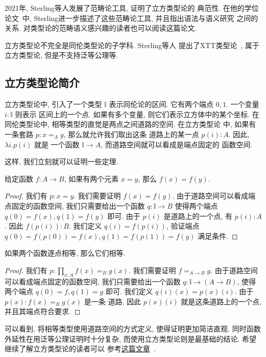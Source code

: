 2021年, Sterling等人发展了范畴论工具, 证明了立方类型论的
典范性. 在他的学位论文~\cite{sterling:2021:thesis}中,
Sterling进一步描述了这些范畴论工具, 并且指出语法与语义研究
之间的关系. 对类型论的范畴语义感兴趣的读者也可以阅读这篇论文.

立方类型论不完全是同伦类型论的子学科. Sterling等人
提出了XTT类型论~\cite{sterling:2019:xtt}, 属于立方类型论,
但是不支持泛等公理等.

\subsection{立方类型论简介}

立方类型论中, 引入了一个类型 \(\mathbb I\) 表示同伦论的区间.
它有两个端点 \(0,1\). 一个变量 \(i : \mathbb I\) 则表示
区间上的一个点. 如果有多个变量, 则它们表示立方体中的某个坐标.
在同伦类型论中, 相等类型的直觉是两点之间道路的空间. 在立方类型论
中, 如果有一条套路 \(p : x =_A y\), 那么就允许我们取出这条
道路上的某一点 \(p(i) : A\). 因此, \(\lambda i. p(i)\) 就是
一个函数 \(\mathbb I \to A\), 而道路空间就可以看成是端点固定的
函数空间.

这样, 我们立刻就可以证明一些定理.

\begin{theorem}
给定函数 \(f : A \to B\), 如果有两个元素 \(x = y\), 那么
\(f(x) = f(y)\).
\end{theorem}
\begin{proof}
我们有 \(p : x = y\). 我们需要证明 \(f(x) = f(y)\).
由于道路空间可以看成端点固定的函数空间, 我们只需要给出一个函数
\(q : \mathbb I \to B\) 使得两个端点 \(q(0) = f(x),
q(1) = f(y)\) 即可. 由于 \(p(i)\) 是道路上的一个点, 有
\(p(i) : A\). 因此 \(f(p(i)) : B\). 我们定义 \(q(i) = f(p(i))\),
验证端点 \(q(0) = f(p(0)) = f(x), q(1) = f(p(1)) = f(y)\)
满足条件.
\end{proof}

\begin{theorem}
如果两个函数逐点相等, 那么它们相等.
\end{theorem}
\begin{proof}
我们有 \(p : \prod_{x : A} f(x) =_B g(x)\). 我们需要证明
\(f =_{A\to B} g\). 由于道路空间可以看成端点固定的函数空间,
我们只需要给出一个函数 \(q : \mathbb I \to (A \to B)\), 使得
两个端点 \(q(0) = f, q(1) = g\) 即可. 我们定义
\(q(i)(x) = p(x)(i)\). 由于 \(p(x) : f(x) =_B g(x)\) 是一条
道路, 因此 \(p(x)(i)\) 就是这条道路上的一个点, 并且其端点符合要求.
\end{proof}

可以看到, 将相等类型使用道路空间的方式定义, 使得证明更加简洁直观.
同时函数外延性在用泛等公理证明时十分复杂, 而使用立方类型论则是最基础的结论.
希望继续了解立方类型论的读者可以
参考\href{https://1lab.dev/1Lab.intro.html}{这篇文章}~\cite{amelia:2023:1lab}.

